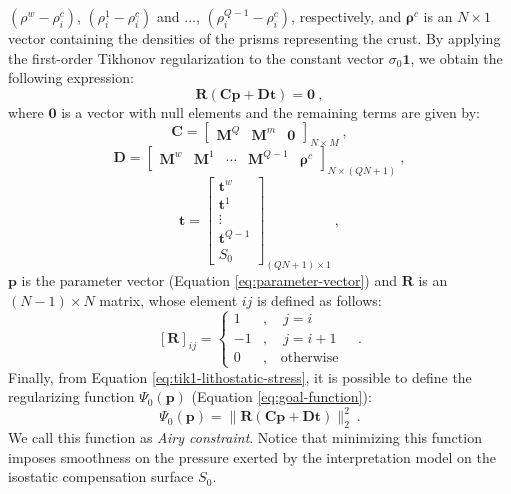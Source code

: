 \documentclass[manuscript]{geophysics}
\begin{document}
$(\rho^{w} - \rho^{c}_{i})$, $(\rho^{1}_{i} - \rho^{c}_{i})$ and $\dots$,
$(\rho^{Q-1}_{i} - \rho^{c}_{i})$, respectively, and $\boldsymbol{\rho}^{c}$ is an 
$N \times 1$ vector containing the densities of the prisms
representing the crust. By applying the first-order Tikhonov regularization
\citep{aster-etal2005} to the constant vector $\sigma_{0} \mathbf{1}$, we obtain the
following expression:
\begin{equation}
\mathbf{R} \left( \mathbf{C} \mathbf{p} + \mathbf{D} \mathbf{t} \right) = \mathbf{0} 
\: ,
\label{eq:tik1-lithostatic-stress}
\end{equation}
where $\mathbf{0}$ is a vector with null elements and the remaining terms are given by:
\begin{equation}
\mathbf{C} = \begin{bmatrix}
\mathbf{M}^{Q} & \mathbf{M}^{m} & \mathbf{0}
\end{bmatrix}_{N \times M} \: ,
\label{eq:matrix-C}
\end{equation}
\begin{equation}
\mathbf{D} = \begin{bmatrix}
\mathbf{M}^{w} & \mathbf{M}^{1} & \cdots & \mathbf{M}^{Q-1} & \boldsymbol{\rho}^{c}
\end{bmatrix}_{N \times \left( QN + 1 \right)} \: ,
\label{eq:matrix-D}
\end{equation}
\begin{equation}
\mathbf{t} = \begin{bmatrix}
\mathbf{t}^{w} \\ \mathbf{t}^{1} \\ \vdots \\ \mathbf{t}^{Q-1} \\ S_{0}
\end{bmatrix}_{\left( QN + 1 \right) \times 1}\: ,
\label{eq:vector-t}
\end{equation}
$\mathbf{p}$ is the parameter vector (Equation \ref{eq:parameter-vector}) and
$\mathbf{R}$ is an $\left( N-1 \right) \times N$ matrix, whose element $ij$ is defined
as follows:
\begin{equation}
\left[ \mathbf{R} \right]_{ij} = \begin{cases}
1 &, \quad j = i \\
-1 &, \quad j = i + 1 \\
0 &, \quad \text{otherwise}
\end{cases} \quad .
\label{eq:matrix-R}
\end{equation}
Finally, from Equation \ref{eq:tik1-lithostatic-stress}, it is possible to
define the regularizing function $\Psi_{0}(\mathbf{p})$ 
(Equation \ref{eq:goal-function}): 
\begin{equation}
\Psi_{0}(\mathbf{p}) = \| \mathbf{R} \left( \mathbf{C} \mathbf{p} + \mathbf{D}
\mathbf{t} \right) \|_{2}^{2} \: .
\label{eq:airy-constraint-function}
\end{equation}
We call this function as \textit{Airy constraint}. Notice that minimizing this
function imposes smoothness on the pressure exerted by the interpretation model on 
the isostatic compensation surface $S_{0}$.
\end{document}
